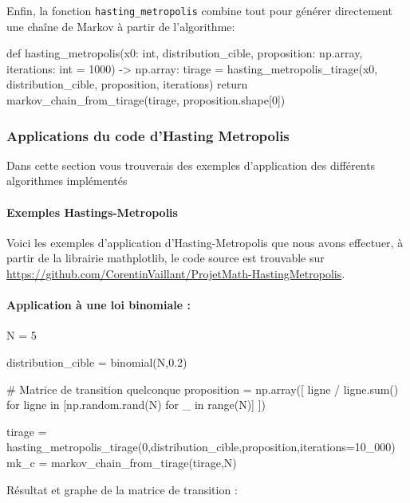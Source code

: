 \documentclass{article}
\begin{document}
Enfin, la fonction \texttt{hasting\_metropolis} combine tout pour générer directement une chaîne de Markov à partir de l'algorithme:

\begin{python}
def hasting_metropolis(x0: int, distribution_cible, 
                       proposition: np.array, iterations: int = 1000) -> np.array:
    tirage = hasting_metropolis_tirage(x0, distribution_cible, proposition, iterations)
    return markov_chain_from_tirage(tirage, proposition.shape[0])
\end{python}

\newpage
\subsubsection{Applications du code d'Hasting Metropolis}

Dans cette section vous trouverais des exemples d'application des différents algorithmes implémentés 

\paragraph{Exemples Hastings-Metropolis}

Voici les exemples d'application d'Hasting-Metropolis que nous avons effectuer,
à partir de la librairie mathplotlib, le code source est trouvable sur \url{https://github.com/CorentinVaillant/ProjetMath-HastingMetropolis}.

\paragraph{Application à une loi binomiale :}
\begin{center}
\begin{python}
N = 5

distribution_cible = binomial(N,0.2)

# Matrice de transition quelconque
proposition = np.array([ ligne / ligne.sum()
    for ligne in [np.random.rand(N) for _ in range(N)]
])


tirage = hasting_metropolis_tirage(0,distribution_cible,proposition,iterations=10_000)
mk_c = markov_chain_from_tirage(tirage,N)
\end{python}
\end{center}
Résultat et graphe de la matrice de transition :
\end{document}
